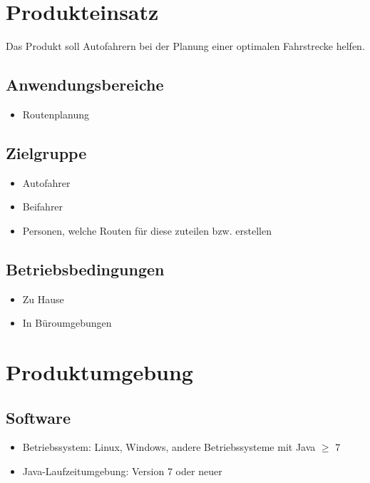\documentclass[a4paper, 11pt]{article}
\begin{document}
\section{Produkteinsatz}

Das Produkt soll Autofahrern bei der Planung einer optimalen Fahrstrecke helfen.

\subsection{Anwendungsbereiche}
\begin{itemize}
\item Routenplanung
\end{itemize}

\subsection{Zielgruppe}
\begin{itemize}
\item Autofahrer
\item Beifahrer
\item Personen, welche Routen für diese zuteilen bzw. erstellen
\end{itemize}

\subsection{Betriebsbedingungen}
\begin{itemize}
\item Zu Hause
\item In Büroumgebungen
\end{itemize}

\section{Produktumgebung}

\subsection{Software}\label{subsec:Software}

\begin{itemize}
\item Betriebssystem: Linux, Windows, andere Betriebssysteme mit Java $\geq$ 7
\item Java-Laufzeitumgebung: Version 7 oder neuer
\end{itemize}
\end{document}
